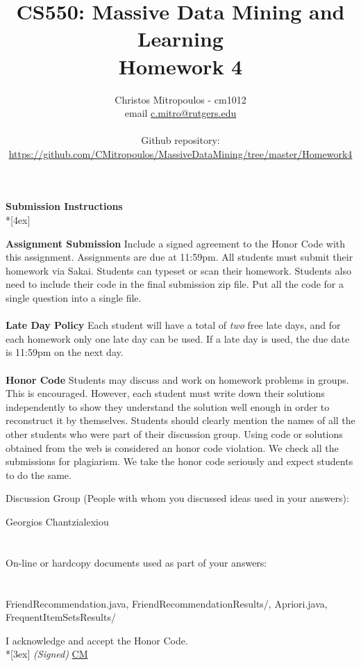 \documentclass[11pt]{article}
\title{\LARGE{\bf \textsf{CS550: Massive Data Mining and Learning}}\\ {\bf \textsf{Homework 4}}}
\author{Christos Mitropoulos - cm1012 \\ email \href{mailto:c.mitro@rutgers.edu}{c.mitro@rutgers.edu} \\\\ Github repository:\\ \href{https://github.com/CMitropoulos/MassiveDataMining/tree/master/Homework4}{https://github.com/CMitropoulos/MassiveDataMining/tree/master/Homework4}}
\date{}
\begin{document}
\begin{titlepage}
\maketitle
\end{titlepage}

\pagebreak[4]
\begin{center}
\LARGE{\bf \textsf{Submission Instructions}} \\*[4ex]
\end{center}

\textbf{Assignment Submission } Include a signed agreement to the Honor Code with this assignment. Assignments are due at 11:59pm. All students must submit their homework via Sakai. Students can typeset or scan their homework. Students also need to include their code in the final submission zip file. Put all the code for a single question into a single file. 
\\
\\
\textbf{Late Day Policy } Each student will have a total of {\em two} free late days, and for each homework only one late day can be used. If a late day is used, the due date is 11:59pm on the next day.
\\
\\
\textbf{Honor Code } Students may discuss and work on homework problems in groups. This is encouraged. However, each student must write down their solutions independently to show they understand the solution well enough in order to reconstruct it by themselves.  Students should clearly mention the names of all the other students who were part of their discussion group. Using code or solutions obtained from the web is considered an honor code violation. We check all the submissions for plagiarism. We take the honor code seriously and expect students to do the same. 

\vfill
\vfill

Discussion Group (People with whom you discussed ideas used in your answers):

 Georgios Chantzialexiou \\\\\\
On-line or hardcopy documents used as part of your answers: \\\\\\
\vfill
FriendRecommendation.java, FriendRecommendationResults/, Apriori.java, FrequentItemSetsResults/
\vfill

I acknowledge and accept the Honor Code.\\*[3ex]
\bigskip
\textit{(Signed)} \underline{CM} 
\end{document}
